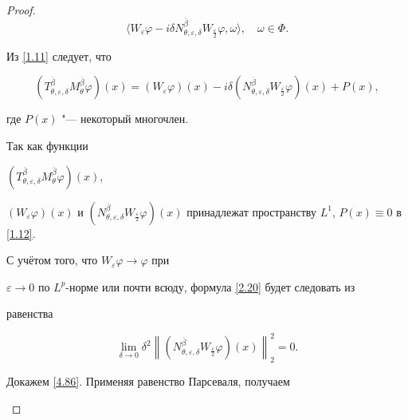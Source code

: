 \begin{proof}
\begin{equation}
 \langle W_\varepsilon

 \varphi-i\delta

 N_{\theta,\varepsilon,\delta}^{\overline{\beta}}W_{\frac\varepsilon 2}

 \varphi,\omega\rangle,\quad \omega\in \Phi.

\end{equation}

Из \eqref{1.11} следует, что

\begin{equation}\label{1.12}

\left(T_{\theta,\varepsilon,\delta}^{\overline{\beta}}M_{\theta}^{\overline{\beta}}\varphi\right)(x)=

 \left( W_\varepsilon\varphi\right)(x)-i\delta

 \left(N_{\theta,\varepsilon,\delta}^{\overline{\beta}}W_{\frac\varepsilon 2}

 \varphi\right)(x)+P(x),

\end{equation}

где $P(x)$ "--- некоторый многочлен.

Так как функции

$\left(T_{\theta,\varepsilon,\delta}^{\overline{\beta}}M_{\theta}^{\overline{\beta}}\varphi\right)(x)$,

  $\left( W_\varepsilon\varphi\right)(x)$ и $\left(N_{\theta,\varepsilon,\delta}^{\overline{\beta}}W_{\frac\varepsilon 2}

 \varphi\right)(x)$ принадлежат пространству $L^1$, $P(x)\equiv0$ в \eqref{1.12}.



С учётом того, что $W_\varepsilon \varphi\rightarrow \varphi$ при

$\varepsilon\rightarrow0$ по $L^p$-норме или почти всюду, формула \eqref{2.20} будет следовать из

равенства

\begin{equation}\label{4.86}

  \lim\limits_{\delta\to

  0}\delta^2\left\|(N_{\theta,\varepsilon,\delta}^{\overline{\beta}}W_{\frac\varepsilon 2}\varphi)(x)\right\|^2_{2}=0.

\end{equation}

Докажем \eqref{4.86}. Применяя равенство Парсеваля, получаем

\begin{equation}\label{4.861}


\end{equation}
\end{proof}
